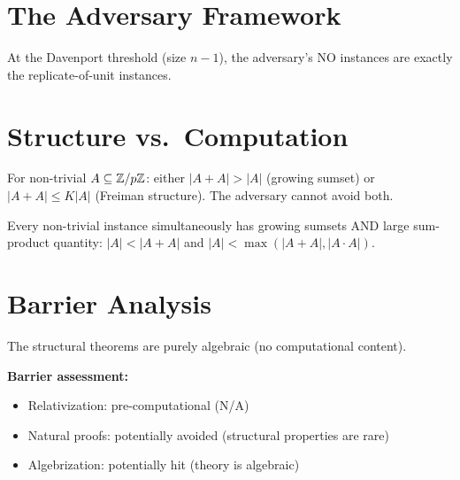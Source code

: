 \section{The Adversary Framework}

\begin{theorem}
  \label{thm:adversary_no}
  \leanok
  At the Davenport threshold (size $n-1$), the adversary's NO instances
  are exactly the replicate-of-unit instances.
\end{theorem}

\section{Structure vs.\ Computation}

\begin{theorem}
  \label{thm:struct_comp_dichotomy}
  \leanok
  For non-trivial $A \subseteq \mathbb{Z}/p\mathbb{Z}$: either $|A+A| > |A|$ (growing sumset)
  or $|A+A| \leq K|A|$ (Freiman structure). The adversary cannot avoid both.
\end{theorem}

\begin{theorem}
  \label{thm:adversary_full}
  \leanok
  Every non-trivial instance simultaneously has growing sumsets AND large
  sum-product quantity: $|A| < |A+A|$ and $|A| < \max(|A+A|, |A \cdot A|)$.
\end{theorem}

\section{Barrier Analysis}

\begin{theorem}
  \label{thm:barriers}
  \leanok
  The structural theorems are purely algebraic (no computational content).

  \textbf{Barrier assessment:}
  \begin{itemize}
    \item Relativization: pre-computational (N/A)
    \item Natural proofs: potentially avoided (structural properties are rare)
    \item Algebrization: potentially hit (theory is algebraic)
  \end{itemize}
\end{theorem}

